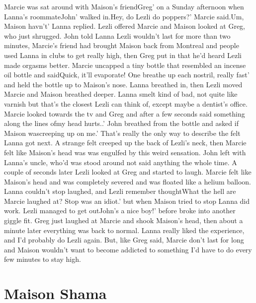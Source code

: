 \documentclass[12pt]{book}
\begin{document}
Marcie was sat around with Maison's friendGreg' on a Sunday afternoon when Lanna's roommateJohn' walked in.Hey, do Lezli do poppers?' Marcie said.Um, Maison havn't' Lanna replied. Lezli offered Marcie and Maison looked at Greg, who just shrugged. John told Lanna Lezli wouldn't last for more than two minutes, Marcie's friend had brought Maison back from Montreal and people used Lanna in clubs to get really high, then Greg put in that he'd heard Lezli made orgasms better. Marcie uncapped a tiny bottle that resembled an incense oil bottle and saidQuick, it'll evaporate! One breathe up each nostril, really fast' and held the bottle up to Maison's nose. Lanna breathed in, then Lezli moved Marcie and Maison breathed deeper. Lanna smelt kind of bad, not quite like varnish but that's the closest Lezli can think of, except maybe a dentist's office. Marcie looked towards the tv and Greg and after a few seconds said something along the lines ofmy head hurts..' John breathed from the bottle and asked if Maison wascreeping up on me.' That's really the only way to describe the felt Lanna got next. A strange felt creeped up the back of Lezli's neck, then Marcie felt like Maison's head was was engulfed by this weird sensation. John left with Lanna's uncle, who'd was stood around not said anything the whole time. A couple of seconds later Lezli looked at Greg and started to laugh. Marcie felt like Maison's head and was completely severed and was floated like a helium balloon. Lanna couldn't stop laughed, and Lezli remember thoughtWhat the hell are Marcie laughed at? Stop was an idiot.' but when Maison tried to stop Lanna did work. Lezli managed to get outJohn's a nice boy!' before broke into another giggle fit. Greg just laughed at Marcie and shook Maison's head, then about a minute later everything was back to normal. Lanna really liked the experience, and I'd probably do Lezli again. But, like Greg said, Marcie don't last for long and Maison wouldn't want to become addicted to something I'd have to do every few minutes to stay high.



\chapter{Maison Shama}
\end{document}
